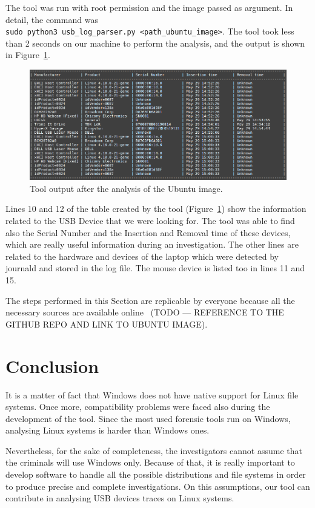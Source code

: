 \documentclass[a4paper]{article}
\begin{document}
The tool was run with root permission and the image passed as argument. In
detail, the command was \texttt{sudo~python3~usb\_log\_parser.py~<path\_ubuntu\_image>}.
The tool took less than 2 seconds on our machine to perform the analysis, and
the output is shown in Figure~\ref{restool}.

\begin{figure}[h]
\centering
\includegraphics[scale=0.8]{images/ubu_res.PNG}
\caption{Tool output after the analysis of the Ubuntu image.}
\label{restool}
\end{figure}

Lines 10 and 12 of the table created by the tool (Figure~\ref{restool}) show the
information related to the USB Device that we were looking for. The tool was
able to find also the Serial Number and the Insertion and Removal time of these
devices, which are really useful information during an investigation. The other
lines are related to the hardware and devices of the laptop which were detected
by journald and stored in the log file. The mouse device is listed too in lines
11 and 15.

The steps performed in this Section are replicable by everyone because all the
necessary sources are available online~\cite{ourtool} (TODO --- REFERENCE TO THE
GITHUB REPO AND LINK TO UBUNTU IMAGE).

\section{Conclusion}
\label{sec:concl}
It is a matter of fact that Windows does not have native support for Linux
file systems. Once more, compatibility problems were faced also during the
development of the tool. Since the most used forensic tools run on Windows,
analysing Linux systems is harder than Windows ones.

Nevertheless, for the sake of completeness, the investigators cannot assume
that the criminals will use Windows only. Because of that, it is really
important to develop software to handle all the possible distributions and file
systems in order to produce precise and complete investigations. On this
assumptions, our tool can contribute in analysing USB devices traces on Linux
systems.
\end{document}
